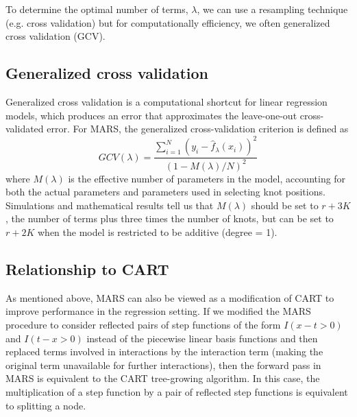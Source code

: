 \documentclass[12pt]{article}
\begin{document}
To determine the optimal number of terms, $\lambda$, we can use a resampling technique (e.g. cross validation) but for computationally efficiency, we often generalized cross validation (GCV).


\subsection{Generalized cross validation} %
\label{sub:generalized_cross_validation}

Generalized cross validation is a computational shortcut for linear regression models, which produces an error that approximates the leave-one-out cross-validated error. For MARS, the generalized cross-validation criterion is defined as
\begin{equation}
  GCV(\lambda) =
    \frac{
      \sum_{i = 1}^{N}(y_{i} - \hat{f}_{\lambda}(x_{i}))^2
    }{
      (1 - M(\lambda)/N)^2
    }
\end{equation}
where $M(\lambda)$ is the effective number of parameters in the model, accounting for both the actual parameters and parameters used in selecting knot positions. Simulations and mathematical results tell us that $M(\lambda)$ should be set to $r + 3K$, the number of terms plus three times the number of knots, but can be set to $r + 2K$ when the model is restricted to be additive (degree = 1).


\subsection{Relationship to CART} %
\label{sub:relationship_to_cart}

As mentioned above, MARS can also be viewed as a modification of CART to improve performance in the regression setting. If we modified the MARS procedure to consider reflected pairs of step functions of the form $I(x - t > 0)$ and $I(t - x > 0)$ instead of the piecewise linear basis functions and then replaced terms involved in interactions by the interaction term (making the original term unavailable for further interactions), then the forward pass in MARS is equivalent to the CART tree-growing algorithm. In this case, the multiplication of a step function by a pair of reflected step functions is equivalent to splitting a node.

\end{document}
